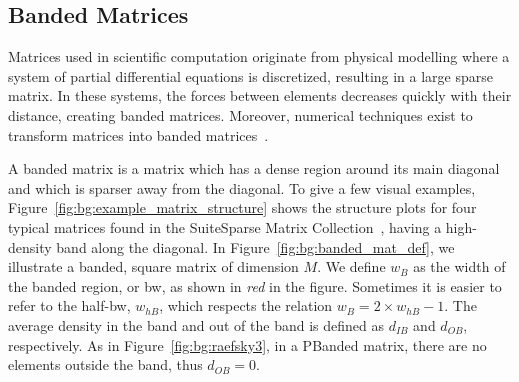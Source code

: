 \subsection{Banded Matrices}
\label{sec:bg:bandedMatrices}

Matrices used in scientific computation originate from physical modelling where a system of partial differential equations is discretized, resulting in a large sparse matrix.
In these systems, the forces between elements decreases quickly with their distance, creating \gls{banded} matrices.
Moreover, numerical techniques exist to transform matrices into \gls{banded} matrices~\cite{Luo1992_MatrixStruct, Mafteiu2014_MatrixStruct, Wang2014_MatrixStruct}.

A \gls{banded} matrix is a matrix which has a dense region around its main diagonal and which is sparser away from the diagonal.
To give a few visual examples, Figure~\ref{fig:bg:example_matrix_structure} shows the structure plots for four typical matrices found in the SuiteSparse Matrix Collection~\cite{Kolodziej2019_SuiteSparse}, having a high-density \gls{band} along the diagonal.
In Figure~\ref{fig:bg:banded_mat_def}, we illustrate a \gls{banded}, square matrix of dimension $M$.
We define $w_B$ as the width of the \gls{banded} region, or \gls{bw}, as shown in \textit{red} in the figure.
Sometimes it is easier to refer to the half-\gls{bw}, $w_{hB}$, which respects the relation $w_B = 2 \times w_\mathit{hB} - 1$.
The average density in the \gls{band} and out of the \gls{band} is defined as $d_\mathit{IB}$ and $d_\mathit{OB}$, respectively.
As in Figure~\ref{fig:bg:raefsky3}, in a \gls{PBanded} matrix, there are no elements outside the \gls{band}, thus $d_\mathit{OB} = 0$.

